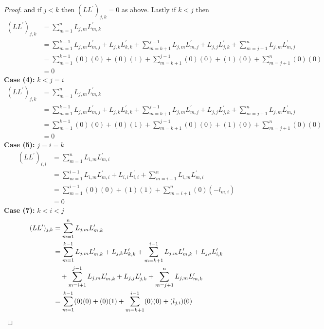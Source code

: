 \documentclass[12pt]{article}
\begin{document}
\begin{proof}
		and if $j<k$ then $(LL^\prime)_{j,k} = 0$ as above. Lastly if $k < j$ then
		\begin{align*}
			(LL^\prime)_{j,k} & = \sum\limits_{m=1}^n L_{j,m}L^\prime_{m,k} \\
			& = \sum\limits_{m=1}^{k-1} L_{j,m}L^\prime_{m,j} + L_{j,k}L^\prime_{k,k} + \sum\limits_{m=k+1}^{j-1} L_{j,m}L^\prime_{m,j} + L_{j,j}L^\prime_{j,k} + \sum\limits_{m=j+1}^{n} L_{j,m}L^\prime_{m,j} \\
			& = \sum\limits_{m=1}^{k-1} (0)(0) + (0)(1) + \sum\limits_{m=k+1}^{j-1} (0)(0) + (1)(0) + \sum\limits_{m=j+1}^{n} (0)(0) \\
			& = 0
		\end{align*}
		\textbf{Case (4):} $k<j=i$
		\begin{align*}
			(LL^\prime)_{j,k} & = \sum\limits_{m=1}^n L_{j,m}L^\prime_{m,k} \\
			& = \sum\limits_{m=1}^{k-1} L_{j,m}L^\prime_{m,j} + L_{j,k}L^\prime_{k,k} + \sum\limits_{m=k+1}^{j-1} L_{j,m}L^\prime_{m,j} + L_{j,j}L^\prime_{j,k} + \sum\limits_{m=j+1}^{n} L_{j,m}L^\prime_{m,j} \\
			& = \sum\limits_{m=1}^{k-1} (0)(0) + (0)(1) + \sum\limits_{m=k+1}^{j-1} (0)(0) + (1)(0) + \sum\limits_{m=j+1}^{n} (0)(0) \\
			& = 0
		\end{align*}
		\textbf{Case (5):} $j=i=k$
		\begin{align*}
			(LL^\prime)_{i,i} & = \sum\limits_{m=1}^n L_{i,m}L^\prime_{m,i} \\
			& = \sum\limits_{m=1}^{i-1} L_{i,m}L^\prime_{m,i} + L_{i,i}L^\prime_{i,i} + \sum\limits_{m=i+1}^{n} L_{i,m}L^\prime_{m,i} \\
			& = \sum\limits_{m=1}^{i-1} (0)(0) + (1)(1) + \sum\limits_{m=i+1}^{n} (0)(-l_{m,i}) \\
			& = 0
		\end{align*}
		\textbf{Case (7):} $k < i < j$
		\begin{align*}
			(LL^\prime)_{j,k} & = \sum\limits_{m=1}^n L_{j,m}L^\prime_{m,k} \\
			& = \sum\limits_{m=1}^{k-1} L_{j,m}L^\prime_{m,k} + L_{j,k}L^\prime_{k,k} + \sum\limits_{m=k+1}^{i-1} L_{j,m}L^\prime_{m,k} + L_{j,i}L^\prime_{i,k} \\
				&\text{\space \space \space} + \sum\limits_{m=i+1}^{j-1} L_{j,m}L^\prime_{m,k} + L_{j,j}L^\prime_{j,k} + \sum\limits_{m=j+1}^{n} L_{j,m}L^\prime_{m,k} \\
			& = \sum\limits_{m=1}^{k-1} (0)(0) + (0)(1) + \sum\limits_{m=k+1}^{i-1} (0)(0) + (l_{j,i})(0) \\

\end{align*}
\end{proof}
\end{document}
